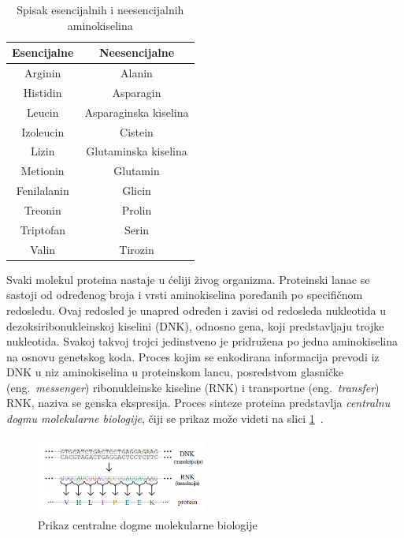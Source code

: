 \begin{table}[h!]
\centering
	\begin{tabular}{||c c||} 
	\hline 
	Esencijalne & Neesencijalne \\ [0.5ex] 
	\hline\hline
	Arginin & Alanin \\ 
	\hline
	Histidin & Asparagin \\
	\hline
	Leucin & Asparaginska kiselina\\
	\hline
	Izoleucin & Cistein \\
	\hline
	Lizin & Glutaminska kiselina \\ [1ex] 
	\hline
	Metionin & Glutamin \\ [1ex] 
	\hline
	Fenilalanin & Glicin \\ [1ex] 
	\hline
	Treonin & Prolin \\ [1ex] 
	\hline
	Triptofan & Serin \\ [1ex] 
	\hline
	Valin & Tirozin \\ [1ex] 
	\hline
	\end{tabular}
\caption{Spisak esencijalnih i neesencijalnih aminokiselina}
\label{table:1}
\end{table}


Svaki molekul proteina nastaje u ćeliji živog organizma. Proteinski lanac se sastoji od određenog broja i vrsti aminokiselina poređanih po specifičnom redosledu. Ovaj redosled je unapred određen i zavisi od redosleda nukleotida u dezoksiribonukleinskoj kiselini (DNK), odnosno gena, koji predstavljaju trojke nukleotida. Svakoj takvoj trojci jedinstveno je pridružena po jedna aminokiselina na osnovu genetskog koda. Proces kojim se enkodirana informacija prevodi iz DNK u niz aminokiselina u proteinskom lancu, posredstvom glasničke (eng.~{\em messenger}) ribonukleinske kiseline (RNK) i transportne (eng.~{\em transfer}) RNK, naziva se genska ekspresija. Proces sinteze proteina predstavlja \textit{centralnu dogmu molekularne biologije}, čiji se prikaz može videti na slici \ref{fig:dogma}~\cite{JKd}.

\begin{figure}[h]
	\centering
    \includegraphics[width=0.5\textwidth]{Figures/BO/dogma.png}
    \caption{Prikaz centralne dogme molekularne biologije~\cite{JKd}}
    \label{fig:dogma}
\end{figure}

